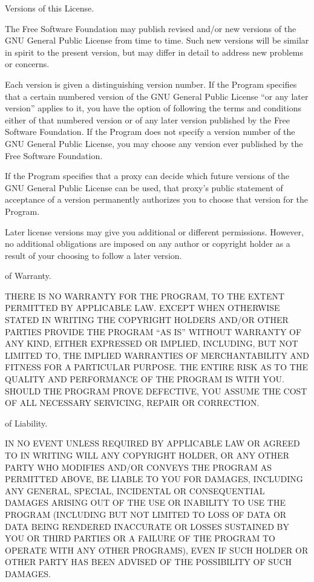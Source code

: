 \itemRevised Versions of this License.

The Free Software Foundation may publish revised and/or new versions
of the GNU General Public License from time to time.  Such new
versions will be similar in spirit to the present version, but may
differ in detail to address new problems or concerns.

Each version is given a distinguishing version number.  If the Program
specifies that a certain numbered version of the GNU General Public
License ``or any later version'' applies to it, you have the option of
following the terms and conditions either of that numbered version or
of any later version published by the Free Software Foundation.  If
the Program does not specify a version number of the GNU General
Public License, you may choose any version ever published by the Free
Software Foundation.

If the Program specifies that a proxy can decide which future versions
of the GNU General Public License can be used, that proxy's public
statement of acceptance of a version permanently authorizes you to
choose that version for the Program.

Later license versions may give you additional or different
permissions.  However, no additional obligations are imposed on any
author or copyright holder as a result of your choosing to follow a
later version.

\itemDisclaimer of Warranty.

THERE IS NO WARRANTY FOR THE PROGRAM, TO THE EXTENT PERMITTED BY
APPLICABLE LAW.  EXCEPT WHEN OTHERWISE STATED IN WRITING THE COPYRIGHT
HOLDERS AND/OR OTHER PARTIES PROVIDE THE PROGRAM ``AS IS'' WITHOUT
WARRANTY OF ANY KIND, EITHER EXPRESSED OR IMPLIED, INCLUDING, BUT NOT
LIMITED TO, THE IMPLIED WARRANTIES OF MERCHANTABILITY AND FITNESS FOR
A PARTICULAR PURPOSE.  THE ENTIRE RISK AS TO THE QUALITY AND
PERFORMANCE OF THE PROGRAM IS WITH YOU.  SHOULD THE PROGRAM PROVE
DEFECTIVE, YOU ASSUME THE COST OF ALL NECESSARY SERVICING, REPAIR OR
CORRECTION.

\itemLimitation of Liability.

IN NO EVENT UNLESS REQUIRED BY APPLICABLE LAW OR AGREED TO IN WRITING
WILL ANY COPYRIGHT HOLDER, OR ANY OTHER PARTY WHO MODIFIES AND/OR
CONVEYS THE PROGRAM AS PERMITTED ABOVE, BE LIABLE TO YOU FOR DAMAGES,
INCLUDING ANY GENERAL, SPECIAL, INCIDENTAL OR CONSEQUENTIAL DAMAGES
ARISING OUT OF THE USE OR INABILITY TO USE THE PROGRAM (INCLUDING BUT
NOT LIMITED TO LOSS OF DATA OR DATA BEING RENDERED INACCURATE OR
LOSSES SUSTAINED BY YOU OR THIRD PARTIES OR A FAILURE OF THE PROGRAM
TO OPERATE WITH ANY OTHER PROGRAMS), EVEN IF SUCH HOLDER OR OTHER
PARTY HAS BEEN ADVISED OF THE POSSIBILITY OF SUCH DAMAGES.

